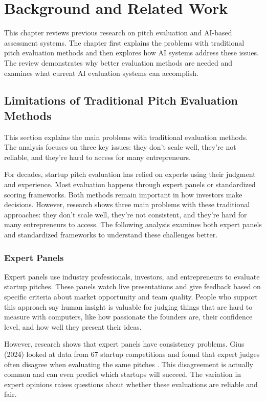\chapter{Background and Related Work}
\label{ch:soa}

This chapter reviews previous research on pitch evaluation and AI-based assessment systems. The chapter first explains the problems with traditional pitch evaluation methods and then explores how AI systems address these issues. The review demonstrates why better evaluation methods are needed and examines what current AI evaluation systems can accomplish.

\section{Limitations of Traditional Pitch Evaluation Methods}
\label{sec:traditional-methods}

This section explains the main problems with traditional evaluation methods. The analysis focuses on three key issues: they don't scale well, they're not reliable, and they're hard to access for many entrepreneurs.

For decades, startup pitch evaluation has relied on experts using their judgment and experience. Most evaluation happens through expert panels or standardized scoring frameworks. Both methods remain important in how investors make decisions. However, research shows three main problems with these traditional approaches: they don't scale well, they're not consistent, and they're hard for many entrepreneurs to access. The following analysis examines both expert panels and standardized frameworks to understand these challenges better.

\subsection{Expert Panels}\label{subsec:expert-panels}
Expert panels use industry professionals, investors, and entrepreneurs to evaluate startup pitches. These panels watch live presentations and give feedback based on specific criteria about market opportunity and team quality. People who support this approach say human insight is valuable for judging things that are hard to measure with computers, like how passionate the founders are, their confidence level, and how well they present their ideas.

However, research shows that expert panels have consistency problems. Gius (2024) looked at data from 67 startup competitions and found that expert judges often disagree when evaluating the same pitches \cite{Gius2024}. This disagreement is actually common and can even predict which startups will succeed. The variation in expert opinions raises questions about whether these evaluations are reliable and fair.

